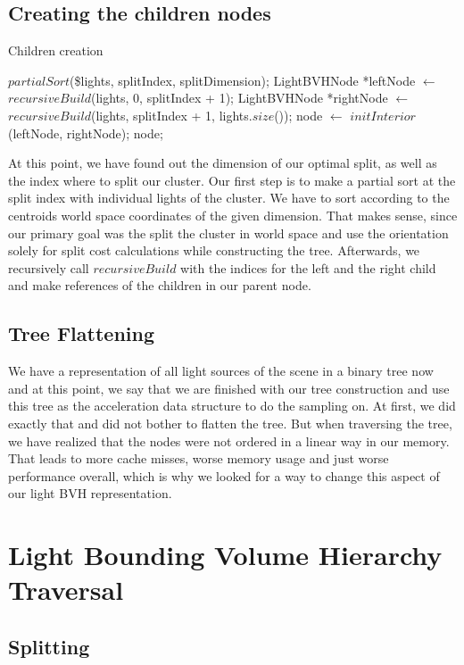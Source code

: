 \subsection{Creating the children nodes}

\begin{algorithm}
	\caption{Children creation}
	\label{alg:childrencreation}
	\begin{algorithmic}[1] %
		\State $partialSort$(\$lights, splitIndex, splitDimension);
		\State LightBVHNode *leftNode $\gets$ $recursiveBuild$(lights, 0, splitIndex + 1);
		\State LightBVHNode *rightNode $\gets$ $recursiveBuild$(lights, splitIndex + 1, lights.$size$());
		\State node $\gets$ $initInterior$(leftNode, rightNode);
		\State \Return node;
		\EndProcedure
	\end{algorithmic}
\end{algorithm}

At this point, we have found out the dimension of our optimal split, as well as the index where to split our cluster. Our first step is to make a partial sort at the split index with individual lights of the cluster. We have to sort according to the centroids world space coordinates of the given dimension. That makes sense, since our primary goal was the split the cluster in world space and use the orientation solely for split cost calculations while constructing the tree. Afterwards, we recursively call $recursiveBuild$ with the indices for the left and the right child and make references of the children in our parent node.

\subsection{Tree Flattening}
\label{subs:flat}

We have a representation of all light sources of the scene in a binary tree now and at this point, we say that we are finished with our tree construction and use this tree as the acceleration data structure to do the sampling on. At first, we did exactly that and did not bother to flatten the tree. But when traversing the tree, we have realized that the nodes were not ordered in a linear way in our memory. That leads to more cache misses, worse memory usage and just worse performance overall, which is why we looked for a way to change this aspect of our light BVH representation.

\section{Light Bounding Volume Hierarchy Traversal}
\label{sec:alg:tra}

\subsection{Splitting}
\label{subs:split}